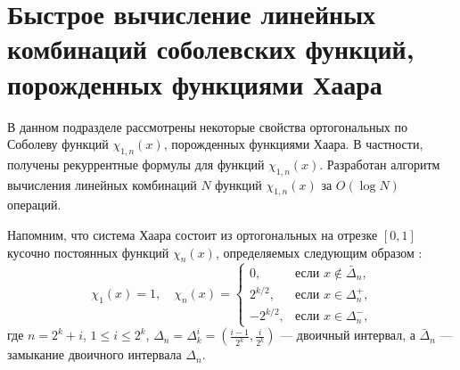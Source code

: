 ﻿\section{Быстрое вычисление линейных комбинаций соболевских функций, порожденных функциями Хаара}

В данном подразделе рассмотрены некоторые свойства ортогональных по Соболеву функций $\chi_{1,n}(x)$, порожденных функциями Хаара. В частности, получены рекуррентные формулы для функций $\chi_{1,n}(x)$. Разработан алгоритм вычисления линейных комбинаций $N$ функций $\chi_{1,n}(x)$ за $O(\log N)$ операций.

Напомним, что система Хаара состоит из ортогональных на отрезке $[0,1]$ кусочно постоянных функций $\chi_n(x)$, определяемых следующим образом \cite[глава 3, с. 70]{mmgmsr1-Kashin}:
\begin{equation}\label{mmgmsr1-haar-def}
\chi_1(x)=1, \quad
\chi_n(x)=\begin{cases} 0,&\text{если $x\notin \bar\Delta_n$,}\\
2^{k/2},& \text{если $x\in \Delta_n^+$,}\\
-2^{k/2},& \text{если $x\in \Delta_n^-$,}
\end{cases}
\end{equation}
где $n=2^k+i$, $1 \le i \le 2^k$, $\Delta_n=\Delta_k^i=(\frac{i-1}{2^k},\frac{i}{2^k})$ --- двоичный интервал, а $\bar\Delta_n$ --- замыкание двоичного интервала $\Delta_n$.

